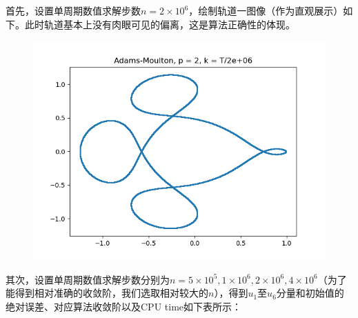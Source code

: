 \documentclass{ctexart}
\begin{document}
\begin{sloppypar}
首先，设置单周期数值求解步数$n = 2 \times 10^6$，绘制轨道一图像（作为直观展示）如下。此时轨道基本上没有肉眼可见的偏离，这是算法正确性的体现。
\begin{figure}[H]
\centering
\includegraphics[scale = 0.45]{./report_src/Figure_9.png}
\end{figure}
其次，设置单周期数值求解步数分别为$n = 5 \times 10^5,1 \times 10^6,2 \times 10^6, 4 \times 10^6$（为了能得到相对准确的收敛阶，我们选取相对较大的$n$），得到$u_1$至$u_6$分量和初始值的绝对误差、对应算法收敛阶以及CPU time如下表所示：


\end{sloppypar}
\end{document}
